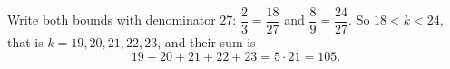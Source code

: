 Write both bounds with denominator $27$: $\dfrac{2}{3}=\dfrac{18}{27}$ and $\dfrac{8}{9}=\dfrac{24}{27}$. So $18<k<24$, that is $k=19,20,21,22,23$, and their sum is
\[
19+20+21+22+23=5\cdot21=\boxed{105}.
\]
